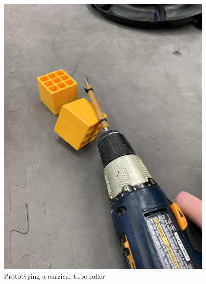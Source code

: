 \begin{figure}[ht]
\begin{minipage}[b]{.48\textwidth}
  \includegraphics[width=0.95\textwidth]{Meetings/November/11-17-21/11-17-21_Hardware_Figure2 - Nathan Forrer.JPG}
  \caption{Prototyping a surgical tube roller}
  \label{fig:111721_2}
\end{minipage}
\end{figure}



